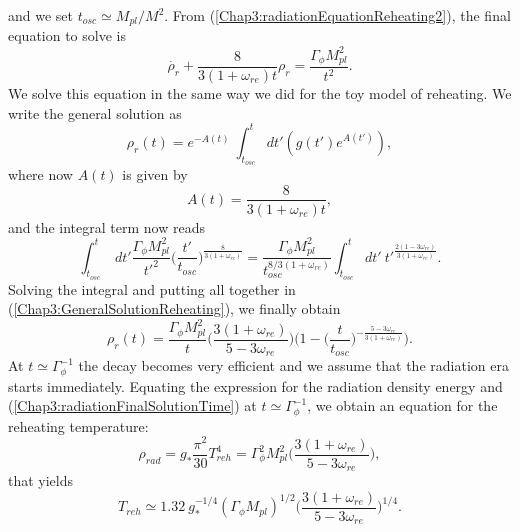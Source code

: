 \documentclass[11pt,a4paper,twoside]{book}
\begin{document}
and we set $ t_{osc}\simeq M_{pl}/M^{2} $. From (\ref{Chap3:radiationEquationReheating2}), the final equation to solve is
\begin{equation}
	\label{Chap3:FinalEquationRadiationReheating}
		\dot{\rho_{r}} + \frac{8}{3(1+\omega_{re})t}\rho_{r} = \frac{\Gamma_{\phi} M_{pl}^{2}}{t^{2}}.
\end{equation}
We solve this equation in the same way we did for the toy model of reheating. We write the general solution as
\begin{equation}
	\label{Chap3:GeneralSolutionReheating}
	\rho_{r}(t)=e^{-A(t)}\ \int_{t_{osc}}^{t} dt'(g(t')e^{A(t')}),
\end{equation}
where now $ A(t) $ is given by
\begin{equation}
	\label{Chap3:A(t)Parameter}
	A(t)=\frac{8}{3(1+\omega_{re})t},
\end{equation}
and the integral term now reads
\begin{equation}
	\label{Chap3:IntegralTermReheating}
	\int_{t_{osc}}^{t}\ dt' \frac{\Gamma_{\phi} M_{pl}^{2}}{t'^{2}}\Bigg(\frac{t'}{t_{osc}}\Bigg)^{\frac{8}{3(1+\omega_{re})}}=
	\frac{\Gamma_{\phi} M_{pl}^{2}}{t_{osc}^{8/3(1+\omega_{re})}}\int_{t_{osc}}^{t} dt'\ t'^{\frac{2(1-3\omega_{re})}{3(1+\omega_{re})}}.
\end{equation}
Solving the integral and putting all together in (\ref{Chap3:GeneralSolutionReheating}), we finally obtain
\begin{equation}
	\label{Chap3:radiationFinalSolutionTime}
	\rho_{r}(t)=\frac{\Gamma_{\phi}M_{pl}^{2}}{t}\Bigg(\frac{3(1+\omega_{re})}{5-3\omega_{re}}\Bigg)\Bigg(1-\Bigg(\frac{t}{t_{osc}}\Bigg)^{-\frac{5-3\omega_{re}}{3(1+\omega_{re})}}\Bigg).
\end{equation}
At $ t\simeq \Gamma_{\phi}^{-1} $ the decay becomes very efficient and we assume that the radiation era starts immediately. Equating the expression for the radiation density energy and (\ref{Chap3:radiationFinalSolutionTime}) at $ t \simeq \Gamma_{\phi}^{-1} $, we obtain an equation for the reheating temperature:
\begin{equation}
	\label{Chap3:EquatingRadiationThermalitation}
\rho_{rad}=g_{*}\frac{\pi^{2}}{30}T_{reh}^{4}=\Gamma_{\phi}^{2}M_{pl}^{2}\Bigg(\frac{3(1+\omega_{re})}{5-3\omega_{re}}\Bigg),
\end{equation}
that yields
\begin{equation}
	T_{reh} \simeq 1.32\ g_{*}^{-1/4} (\Gamma_{\phi}M_{pl})^{1/2}\Bigg(\frac{3(1+\omega_{re})}{5-3\omega_{re}}\Bigg)^{1/4}.
\end{equation}
\end{document}
